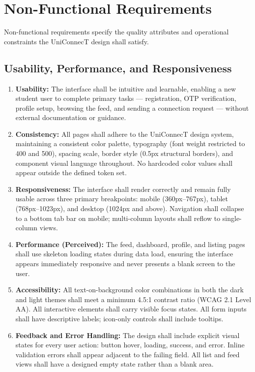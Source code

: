 \documentclass[12pt, a4paper]{article}
\begin{document}
\section{Non-Functional Requirements}

Non-functional requirements specify the quality attributes and operational constraints
the UniConnecT design shall satisfy.

\subsection{Usability, Performance, and Responsiveness}

\begin{enumerate}[label=\textbf{NFR-\arabic*:}, leftmargin=*, align=left]

    \item \textbf{Usability:} The interface shall be intuitive and learnable, enabling
    a new student user to complete primary tasks --- registration, OTP verification,
    profile setup, browsing the feed, and sending a connection request --- without
    external documentation or guidance.

    \item \textbf{Consistency:} All pages shall adhere to the UniConnecT design system,
    maintaining a consistent color palette, typography (font weight restricted to 400
    and 500), spacing scale, border style (0.5px structural borders), and component
    visual language throughout. No hardcoded color values shall appear outside the
    defined token set.

    \item \textbf{Responsiveness:} The interface shall render correctly and remain fully
    usable across three primary breakpoints: mobile (360px--767px), tablet
    (768px--1023px), and desktop (1024px and above). Navigation shall collapse to a
    bottom tab bar on mobile; multi-column layouts shall reflow to single-column views.

    \item \textbf{Performance (Perceived):} The feed, dashboard, profile, and listing
    pages shall use skeleton loading states during data load, ensuring the interface
    appears immediately responsive and never presents a blank screen to the user.

    \item \textbf{Accessibility:} All text-on-background color combinations in both
    the dark and light themes shall meet a minimum 4.5:1 contrast ratio (WCAG 2.1
    Level AA). All interactive elements shall carry visible focus states. All form
    inputs shall have descriptive labels; icon-only controls shall include tooltips.

    \item \textbf{Feedback and Error Handling:} The design shall include explicit
    visual states for every user action: button hover, loading, success, and error.
    Inline validation errors shall appear adjacent to the failing field. All list
    and feed views shall have a designed empty state rather than a blank area.

\end{enumerate}
\end{document}
